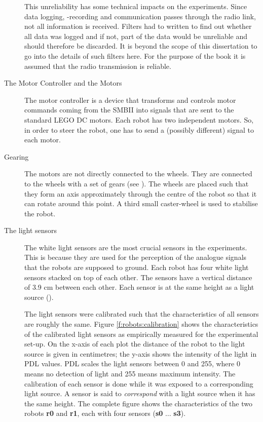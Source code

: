 \begin{description}
This unreliability has some technical impacts on the experiments. Since data logging, -recording and communication passes through the radio link, not all information is received. Filters had to written to find out whether all data was logged and if not, part of the data would be unreliable and should therefore be discarded. It is beyond the scope of this dissertation to go into the details of such filters here. For the purpose  of the book it is assumed that the radio transmission is reliable.

\item[The Motor Controller and the Motors] The motor controller is a device that transforms and controls motor commands coming from the SMBII into signals that are sent to the standard LEGO DC motors. Each robot has two independent motors. So, in order to steer the robot, one has to send a (possibly different) signal to each motor.

\item[Gearing] The motors are not directly connected to the wheels. They are connected to the wheels with a set of gears (see ). The wheels are placed such that they form an axis approximately through the centre of the robot so that it can rotate around this point. A third small caster-wheel is used to stabilise the robot. 

\item[The light sensors] The white light sensors are the most crucial sensors in the experiments. This is because they are used for the perception of the analogue signals that the robots are supposed to ground. Each robot has four white light sensors stacked on top of each other. The sensors have a vertical distance of 3.9 cm between each other. Each sensor is at the same height as a light source (). 

The light sensors were calibrated such that the characteristics of all sensors are roughly the same. Figure \ref{f:robots:calibration} shows the characteristics of the calibrated light sensors as empirically measured for the experimental set-up. On the x-axis of each plot the distance of the robot to the light source is given in centimetres; the y-axis shows the intensity of the light in PDL values. PDL scales the light sensors between 0 and 255, where 0 means no detection of light and 255 means maximum intensity. The calibration of each sensor is done while it was exposed to a corresponding light source. A sensor is said to {\em correspond} with a light source when it has the same height. The complete figure shows the characteristics of the two robots {\bf r0} and {\bf r1}, each with four sensors ({\bf s0} $\ldots$ {\bf s3}).


\end{description}
